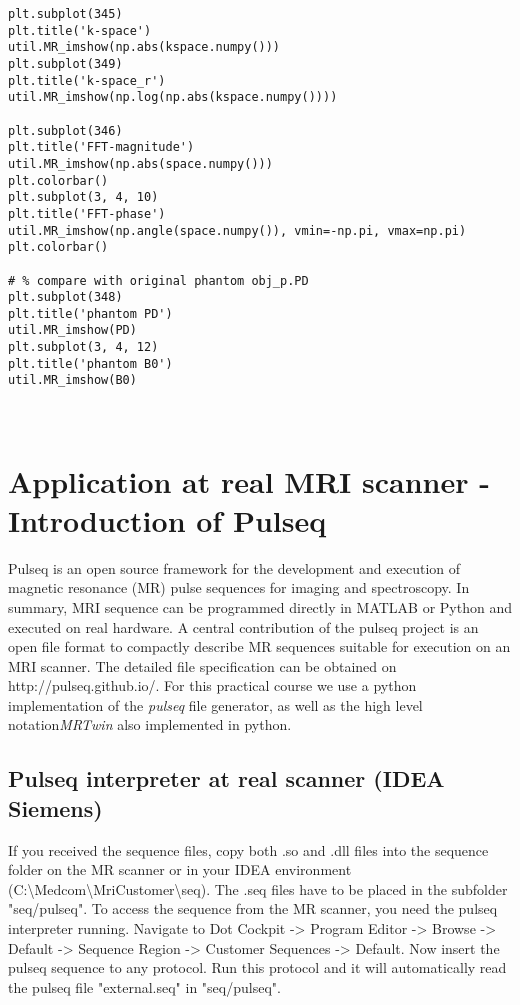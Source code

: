 \documentclass[a4paper,12pt]{extarticle}
\begin{document}
\begin{verbatim}
plt.subplot(345)
plt.title('k-space')
util.MR_imshow(np.abs(kspace.numpy()))
plt.subplot(349)
plt.title('k-space_r')
util.MR_imshow(np.log(np.abs(kspace.numpy())))

plt.subplot(346)
plt.title('FFT-magnitude')
util.MR_imshow(np.abs(space.numpy()))
plt.colorbar()
plt.subplot(3, 4, 10)
plt.title('FFT-phase')
util.MR_imshow(np.angle(space.numpy()), vmin=-np.pi, vmax=np.pi)
plt.colorbar()

# % compare with original phantom obj_p.PD
plt.subplot(348)
plt.title('phantom PD')
util.MR_imshow(PD)
plt.subplot(3, 4, 12)
plt.title('phantom B0')
util.MR_imshow(B0)



\end{verbatim}

\newpage

\section{Application at real MRI scanner - Introduction of Pulseq}
\vspace{7.5cm}
	Pulseq is an open source framework for the development and execution of magnetic resonance (MR) pulse sequences for imaging and spectroscopy. In summary, MRI sequence can be programmed directly in MATLAB or Python and executed on real hardware.
    A central contribution of the pulseq project is an open file format to compactly describe MR sequences suitable for execution on an MRI scanner. The detailed file specification can be obtained on http://pulseq.github.io/.
    For this practical course we use a  python implementation of the \emph{pulseq} file generator, as well as the  high level notation\emph{MRTwin} also implemented in python.  

\subsection{Pulseq interpreter at real scanner (IDEA Siemens)}
            If you received the sequence files, copy both .so and .dll files into the sequence folder on the MR scanner or in your IDEA environment (C:\textbackslash Medcom\textbackslash MriCustomer\textbackslash seq). The .seq files have to be placed in the subfolder "seq/pulseq".
            To access the sequence from the MR scanner, you need the pulseq interpreter running. Navigate to Dot Cockpit -> Program Editor -> Browse -> Default -> Sequence Region -> Customer Sequences -> Default. Now insert the pulseq sequence to any protocol. Run this protocol and it will automatically read the pulseq file "external.seq" in "seq/pulseq".
            
\end{document}
